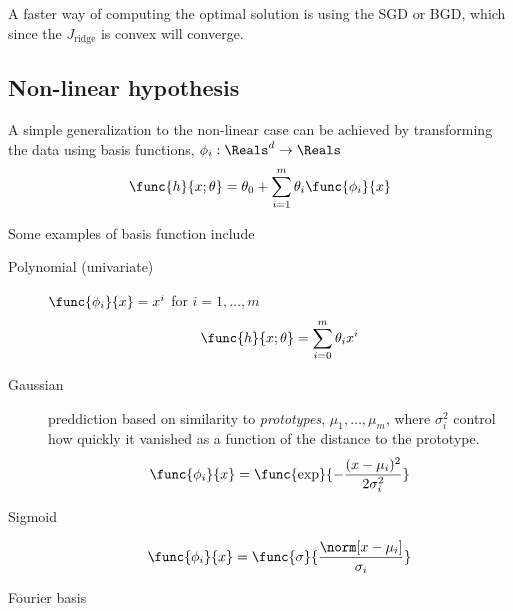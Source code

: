 A faster way of computing the optimal solution is using the SGD or BGD, which since the \(J_{\mathrm{ridge}}\) is convex will converge.
\subsection{Non-linear hypothesis}
A simple generalization to the non-linear case can be achieved by transforming the data using basis functions, \(\phi_i : \Reals^d \to \Reals\)  
\begin{equation*}
    \func{h}{x; \theta } = \theta_0 + \sum_{i = 1}^m \theta_i \func{\phi_i}{x}
\end{equation*}

Some examples of basis function include 
\begin{description}
    \item[Polynomial (univariate)] \(\func{\phi_i}{x} = x^i\) for \(i = 1, \dots, m\)
    \begin{equation*}
        \func{h}{x; \theta } =  \sum_{i = 0}^m \theta_i x^i
    \end{equation*}
    \item[Gaussian] preddiction based on similarity to \textit{prototypes}, \(\mu_1 , \dots , \mu_m\), where \(\sigma_i^2\) control how quickly it vanished as a function of the distance to the prototype.
    \begin{equation*}
        \func{\phi_i}{x} = \func{\exp}{-\dfrac{(x - \mu_i)^2}{2 \sigma_i^2}}
    \end{equation*} 
    \item[Sigmoid]
    \begin{equation*}
        \func{\phi_i}{x} = \func{\sigma}{\dfrac{\norm[x - \mu_i]}{\sigma_i}}
    \end{equation*} 
    \item[Fourier basis]
\end{description}

